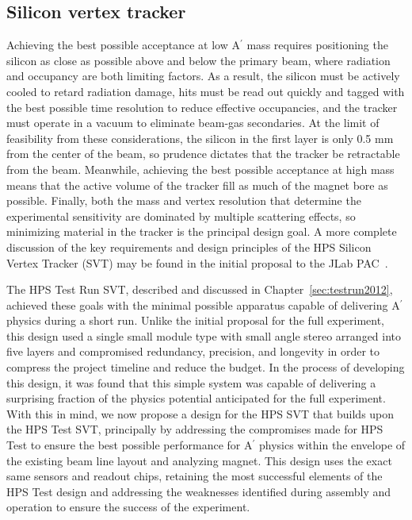 \subsection{Silicon vertex tracker}
\label{sec:svt}
Achieving the best possible acceptance at low A$^\prime$ mass requires positioning the silicon as close as possible above and below the primary beam, where radiation and occupancy are both limiting factors.  As a result, the silicon must be actively cooled to retard radiation damage, hits must be read out quickly and tagged with the best possible time resolution to reduce effective occupancies, and the tracker must operate in a vacuum to eliminate beam-gas secondaries.  At the limit of feasibility from these considerations, the silicon in the first layer is only 0.5 mm from the center of the beam, so prudence dictates that the tracker be retractable from the beam. Meanwhile, achieving the best possible acceptance at high mass means that the active volume of the tracker fill as much of the magnet bore as possible.  Finally, both the mass and vertex resolution that determine the experimental sensitivity are dominated by multiple scattering effects, so minimizing material in the tracker is the principal design goal. A more complete discussion of the key requirements and design principles of the HPS Silicon Vertex Tracker (SVT) may be found in the initial proposal to the JLab PAC~\cite{HPS_PROP}.  

The HPS Test Run SVT, described and discussed in Chapter~\ref{sec:testrun2012}, achieved these goals with the minimal possible apparatus capable of delivering A$^\prime$ physics during a short run. Unlike the initial proposal for the full experiment, this design used a single small module type with small angle stereo arranged into five layers and compromised redundancy, precision, and longevity in order to compress the project timeline and reduce the budget. In the process of developing this design, it was found that this simple system was capable of delivering a surprising fraction of the physics potential anticipated for the full experiment.  With this in mind, we now propose a design for the HPS SVT that builds upon the HPS Test  SVT, principally by addressing the compromises made for HPS Test to ensure the best possible performance for A$^\prime$ physics within the envelope of the existing beam line layout and analyzing magnet.  This design uses the exact same sensors and readout chips, retaining the most successful elements of the HPS Test design and addressing the weaknesses identified during assembly and operation to ensure the success of the experiment.

